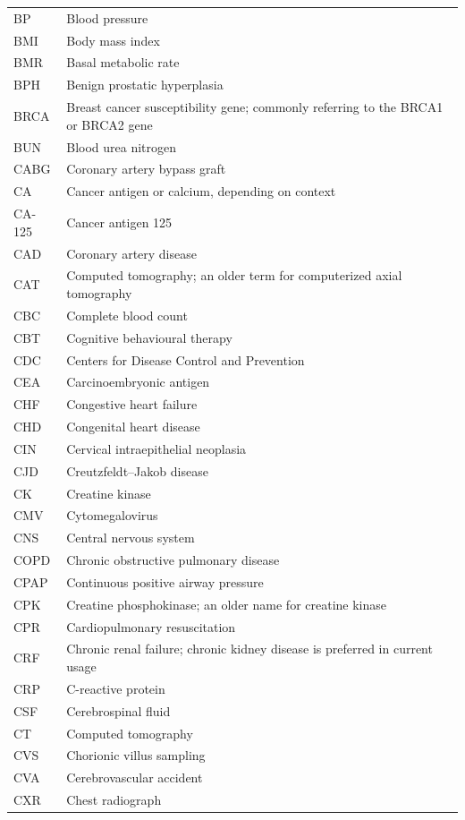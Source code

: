\begin{longtable}{>{\raggedright\arraybackslash}p{} >{\raggedright\arraybackslash}p{}}
BP & Blood pressure \\
BMI & Body mass index \\
BMR & Basal metabolic rate \\
BPH & Benign prostatic hyperplasia \\
BRCA & Breast cancer susceptibility gene; commonly referring to the BRCA1 or BRCA2 gene \\
BUN & Blood urea nitrogen \\
CABG & Coronary artery bypass graft \\
CA & Cancer antigen or calcium, depending on context \\
CA-125 & Cancer antigen 125 \\
CAD & Coronary artery disease \\
CAT & Computed tomography; an older term for computerized axial tomography \\
CBC & Complete blood count \\
CBT & Cognitive behavioural therapy \\
CDC & Centers for Disease Control and Prevention \\
CEA & Carcinoembryonic antigen \\
CHF & Congestive heart failure \\
CHD & Congenital heart disease \\
CIN & Cervical intraepithelial neoplasia \\
CJD & Creutzfeldt–Jakob disease \\
CK & Creatine kinase \\
CMV & Cytomegalovirus \\
CNS & Central nervous system \\
COPD & Chronic obstructive pulmonary disease \\
CPAP & Continuous positive airway pressure \\
CPK & Creatine phosphokinase; an older name for creatine kinase \\
CPR & Cardiopulmonary resuscitation \\
CRF & Chronic renal failure; chronic kidney disease is preferred in current usage \\
CRP & C-reactive protein \\
CSF & Cerebrospinal fluid \\
CT & Computed tomography \\
CVS & Chorionic villus sampling \\
CVA & Cerebrovascular accident \\
CXR & Chest radiograph \\

\end{longtable}
